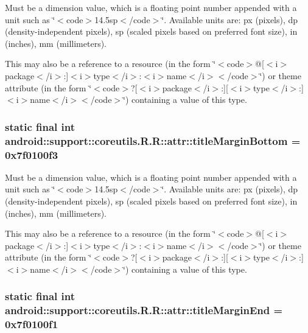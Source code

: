 Must be a dimension value, which is a floating point number appended with a unit such as \char`\"{}$<$code$>$14.5sp$<$/code$>$\char`\"{}. Available units are: px (pixels), dp (density-independent pixels), sp (scaled pixels based on preferred font size), in (inches), mm (millimeters). 

This may also be a reference to a resource (in the form \char`\"{}$<$code$>$@\mbox{[}$<$i$>$package$<$/i$>$:\mbox{]}$<$i$>$type$<$/i$>$:$<$i$>$name$<$/i$>$$<$/code$>$\char`\"{}) or theme attribute (in the form \char`\"{}$<$code$>$?\mbox{[}$<$i$>$package$<$/i$>$:\mbox{]}\mbox{[}$<$i$>$type$<$/i$>$:\mbox{]}$<$i$>$name$<$/i$>$$<$/code$>$\char`\"{}) containing a value of this type. \hypertarget{classandroid_1_1support_1_1coreutils_1_1_r_1_1attr_2047cc01f369ec3eecf6e0f666203c80}{
\subsubsection[{titleMarginBottom}]{\setlength{\rightskip}{0pt plus 5cm}static final int android::support::coreutils.R.R::attr::titleMarginBottom = 0x7f0100f3}}
\label{classandroid_1_1support_1_1coreutils_1_1_r_1_1attr_2047cc01f369ec3eecf6e0f666203c80}


Must be a dimension value, which is a floating point number appended with a unit such as \char`\"{}$<$code$>$14.5sp$<$/code$>$\char`\"{}. Available units are: px (pixels), dp (density-independent pixels), sp (scaled pixels based on preferred font size), in (inches), mm (millimeters). 

This may also be a reference to a resource (in the form \char`\"{}$<$code$>$@\mbox{[}$<$i$>$package$<$/i$>$:\mbox{]}$<$i$>$type$<$/i$>$:$<$i$>$name$<$/i$>$$<$/code$>$\char`\"{}) or theme attribute (in the form \char`\"{}$<$code$>$?\mbox{[}$<$i$>$package$<$/i$>$:\mbox{]}\mbox{[}$<$i$>$type$<$/i$>$:\mbox{]}$<$i$>$name$<$/i$>$$<$/code$>$\char`\"{}) containing a value of this type. \hypertarget{classandroid_1_1support_1_1coreutils_1_1_r_1_1attr_ed3941c9c85274f995f7267843f1f3e3}{
\subsubsection[{titleMarginEnd}]{\setlength{\rightskip}{0pt plus 5cm}static final int android::support::coreutils.R.R::attr::titleMarginEnd = 0x7f0100f1}}
\label{classandroid_1_1support_1_1coreutils_1_1_r_1_1attr_ed3941c9c85274f995f7267843f1f3e3}


